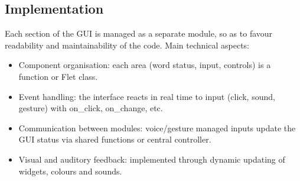 \subsection{Implementation}
Each section of the GUI is managed as a separate module, so as to favour readability and maintainability of the code.
Main technical aspects:
\begin{itemize}
    \item Component organisation: each area (word status, input, controls) is a function or Flet class.
    \item Event handling: the interface reacts in real time to input (click, sound, gesture) with on\_click, on\_change, etc.
    \item Communication between modules: voice/gesture managed inputs update the GUI status via shared functions or central controller.
    \item Visual and auditory feedback: implemented through dynamic updating of widgets, colours and sounds.
\end{itemize}


